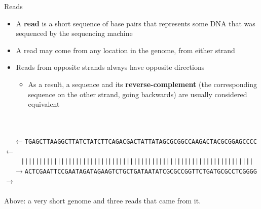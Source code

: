\documentclass[xcolor=dvipsnames]{beamer}
\begin{document}
\begin{frame}{Reads}
    \begin{itemize}
        \item A {\bf read} is a short sequence of base pairs that represents
        some DNA that was sequenced by the sequencing machine
        \item A read may come from any location in the genome, from either
        strand
        \item Reads from opposite strands always have opposite directions
            \begin{itemize}
                \item As a result, a sequence and its {\bf reverse-complement}
                (the corresponding sequence on the other strand, going
                backwards) are usually considered equivalent
            \end{itemize}
    \end{itemize}
        {\scriptsize
            {\tt \ \ }
            \\
            {\tt \ \ }
            \\
            {\tt \ \ }
            {\tt $\leftarrow$TGAGCTTAAGGCTTATCTATCTTCAGACGACTATTATAGCGCGGCCAAGACTACGCGGAGCCCC$\leftarrow$} \\
            \vspace{-0.1cm}
            {\tt \ \ \ \ } {\tt |||||||||||||||||||||||||||||||||||||||||||||||||||||||||||||||| } \\
            \vspace{-0.1cm}
            {\tt \ \ }
            {\tt $\rightarrow$ACTCGAATTCCGAATAGATAGAAGTCTGCTGATAATATCGCGCCGGTTCTGATGCGCCTCGGGG$\rightarrow$} \\
            \vspace{-0.16cm}
            {\tt \ \ } 
            \vspace{0.5cm}
        }
        \\
        {Above: a very short genome and three reads that came from it}.
\end{frame}
\end{document}
